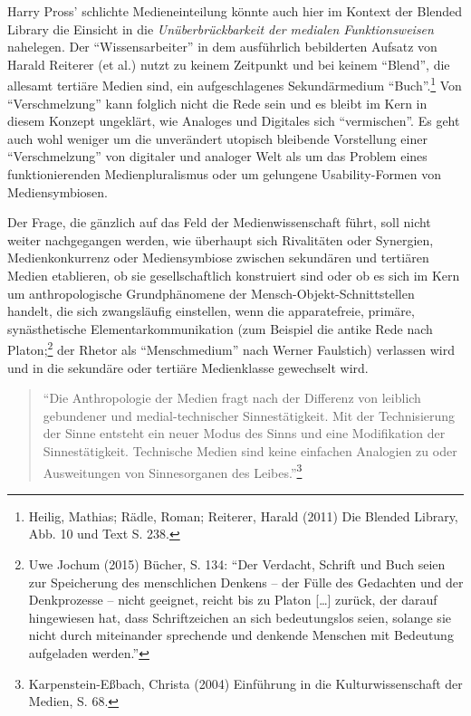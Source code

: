\documentclass[a4paper,
fontsize=11pt,
oneside,
numbers=noperiodatend,
parskip=half-,
bibliography=totoc,
final
]{scrartcl}
\begin{document}
Harry Pross' schlichte Medieneinteilung könnte auch hier im Kontext der
Blended Library die Einsicht in die \emph{Unüberbrückbarkeit der
medialen Funktionsweisen} nahelegen. Der \enquote{Wissensarbeiter} in
dem ausführlich bebilderten Aufsatz von Harald Reiterer (et al.) nutzt
zu keinem Zeitpunkt und bei keinem \enquote{Blend}, die allesamt
tertiäre Medien sind, ein aufgeschlagenes Sekundärmedium
\enquote{Buch}.\footnote{Heilig, Mathias; Rädle, Roman; Reiterer, Harald
  (2011) Die Blended Library, Abb. 10 und Text S. 238.} Von
\enquote{Verschmelzung} kann folglich nicht die Rede sein und es bleibt
im Kern in diesem Konzept ungeklärt, wie Analoges und Digitales sich
\enquote{vermischen}. Es geht auch wohl weniger um die unverändert
utopisch bleibende Vorstellung einer \enquote{Verschmelzung} von
digitaler und analoger Welt als um das Problem eines funktionierenden
Medienpluralismus oder um gelungene Usability-Formen von
Mediensymbiosen.

Der Frage, die gänzlich auf das Feld der Medienwissenschaft führt, soll
nicht weiter nachgegangen werden, wie überhaupt sich Rivalitäten oder
Synergien, Medienkonkurrenz oder Mediensymbiose zwischen sekundären und
tertiären Medien etablieren, ob sie gesellschaftlich konstruiert sind
oder ob es sich im Kern um anthropologische Grundphänomene der
Mensch-Objekt-Schnittstellen handelt, die sich zwangsläufig einstellen,
wenn die apparatefreie, primäre, synästhetische Elementarkommunikation
(zum Beispiel die antike Rede nach Platon;\footnote{Uwe Jochum (2015)
  Bücher, S. 134: \enquote{Der Verdacht, Schrift und Buch seien zur
  Speicherung des menschlichen Denkens -- der Fülle des Gedachten und
  der Denkprozesse -- nicht geeignet, reicht bis zu Platon
  {[}\ldots{}{]} zurück, der darauf hingewiesen hat, dass Schriftzeichen
  an sich bedeutungslos seien, solange sie nicht durch miteinander
  sprechende und denkende Menschen mit Bedeutung aufgeladen werden.}}
der Rhetor als \enquote{Menschmedium} nach Werner Faulstich) verlassen
wird und in die sekundäre oder tertiäre Medienklasse gewechselt wird.

\begin{quote}
\enquote{Die Anthropologie der Medien fragt nach der Differenz von
leiblich gebundener und medial-technischer Sinnestätigkeit. Mit der
Technisierung der Sinne entsteht ein neuer Modus des Sinns und eine
Modifikation der Sinnestätigkeit. Technische Medien sind keine einfachen
Analogien zu oder Ausweitungen von Sinnesorganen des Leibes.}\footnote{Karpenstein-Eßbach,
  Christa (2004) Einführung in die Kulturwissenschaft der Medien, S. 68.}
\end{quote}
\end{document}
